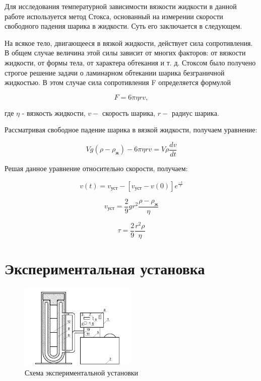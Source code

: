 \documentclass[a4paper, 12pt]{article}%
\begin{document}
Для исследования температурной зависимости вязкости жидкости в данной работе используется метод Стокса, основанный на измерении скорости свободного падения шарика в жидкости. Суть его заключается в следующем.

На всякое тело, двигающееся в вязкой жидкости, действует сила сопротивления. В общем случае величина этой силы зависит от многих факторов: от вязкости жидкости, от формы тела, от характера обтекания и т. д. Стоксом было получено строгое решение задачи о ламинарном обтекании шарика безграничной жидкостью. В этом случае сила сопротивления F определяется формулой

$$ F = 6\pi \eta rv,$$\label{eq:Stock's_force}

где $\eta$ - вязкость жидкости, $v - $ скорость шарика, $r - $ радиус шарика.

Рассматривая свободное падение шарика в вязкой жидкости, получаем уравнение:

$$Vg\left(\rho - \rho_{\text{ж}}\right) - 6\pi \eta rv = V\rho \frac{dv}{dt}$$\label{eq:Newton_second_law_for_ball}

Решая данное уравнение относительно скорости, получаем:

$$v\left(t\right) = v_{\text{уст}} - \left[v_{\text{уст}} - v\left(0\right)\right]e^{\frac{-t}{\tau}}$$\label{eq:velocity_equation}

$$v_{\text{уст}} = \frac{2}{9}gr^{2}\frac{\rho - \rho_{\text{ж}}}{\eta}$$ 

$$\tau = \frac{2}{9}\frac{r^{2}\rho}{\eta}$$

\section{Экспериментальная установка}
\begin{figure}[h!]
	\begin{center}
		\includegraphics[width = 0.5\textwidth]{Fig.1.png}
		\caption{Схема экспериментальной установки}
		\label{fig:facility}
	\end{center}
\end{figure}
\newpage
\end{document}
